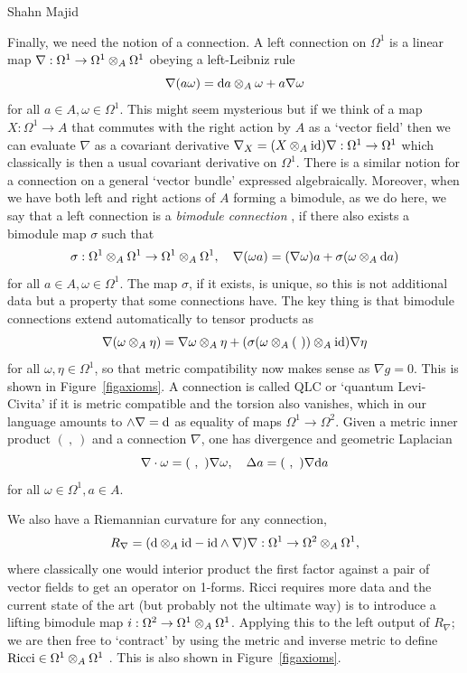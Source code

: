 \begin{artengenv}{Shahn Majid}
 
Finally, we need the notion of a connection. A left connection on $\Omega^1$ is a linear map $\nabla :\Omega^1\to \Omega^1\otimes_A\Omega^1$ obeying a left-Leibniz rule 
\begin{equation}\label{connleib}\nabla(a\omega)=\extd a\tens_A \omega+ a\nabla \omega\end{equation} 
for all $a\in A, \omega\in \Omega^1$. This might seem mysterious but if we think of a map $X:\Omega^1\to A$ that commutes with the right action by $A$ as a `vector field' then we can evaluate $\nabla$ as a covariant derivative $\nabla_X=(X\otimes_A{\rm id})\nabla:\Omega^1\to \Omega^1$ which classically is then a usual covariant derivative on $\Omega^1$. There is a similar notion for a connection on a general `vector bundle' expressed algebraically. Moreover, when we have both left and right actions of $A$ forming a bimodule, as we do here, we say that a left connection is a {\em bimodule connection} \parencite{DV2,BegMa:gra}, if there also exists a bimodule map $\sigma$ such that
\begin{equation}\label{sigma} \sigma:\Omega^1\tens_A\Omega^1\to \Omega^1\tens_A\Omega^1,\quad \nabla(\omega a)=(\nabla\omega)a+\sigma(\omega\tens_A\extd a)\end{equation}
for all $a\in A, \omega\in \Omega^1$. The map $\sigma$, if it exists, is unique, so this is not additional data but a property that some connections have. The key thing is that bimodule connections extend automatically to tensor products as 
\begin{equation} \nabla(\omega\tens_A\eta)=\nabla\omega\tens_A\eta+(\sigma(\omega\tens_A(\ ))\tens_A\id)\nabla\eta\end{equation} for all $\omega,\eta\in \Omega^1$, so that metric compatibility now makes sense as $\nabla g=0$. This is shown in Figure~\ref{figaxioms}. A connection is called QLC or `quantum Levi-Civita' if it is metric compatible and the torsion also vanishes, which in our language amounts to $\wedge\nabla={\rm d}$ as equality of maps $\Omega^1\to \Omega^2$. Given a metric inner product $(\ ,\ )$ and a connection $\nabla$, one has divergence and geometric Laplacian
\begin{equation}\label{divlap} \nabla\cdot\omega=(\ ,\ )\nabla\omega,\quad \Delta a=(\ ,\ )\nabla\extd a\end{equation}
for all $\omega\in\Omega^1, a\in A$. 

We also have a Riemannian curvature for any connection,
\begin{equation}\label{curv} R_\nabla=(\extd\tens_A\id-\id\wedge\nabla)\nabla:\Omega^1\to \Omega^2\tens_A\Omega^1,\end{equation} where classically one would interior product the first factor against a pair of vector fields to get an operator on 1-forms. Ricci requires more data and the current state of the art (but probably not the ultimate way) is to introduce a lifting bimodule map $i:\Omega^2\to\Omega^1\otimes_A\Omega^1$. Applying this to the left output of $R_\nabla$; we are then free to `contract' by using the metric and inverse metric to define ${\rm Ricci}\in \Omega^1\otimes_A\Omega^1$ \parencite{BegMa:spe}. This is also shown in Figure~\ref{figaxioms}. 


\end{artengenv}
